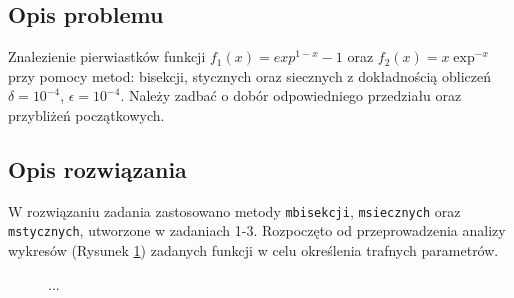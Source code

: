 \documentclass{classrep}
\begin{document}
	\subsection{Opis problemu}
		Znalezienie pierwiastków funkcji $f_1(x)=exp^{1-x}-1$ oraz $f_2(x)=x\exp^{-x}$ przy pomocy metod: bisekcji, stycznych oraz siecznych z dokładnością obliczeń $\delta=10^{-4}$, $\epsilon=10^{-4}$. Należy zadbać o dobór odpowiedniego przedziału oraz przybliżeń początkowych.
		
	\subsection{Opis rozwiązania}
		W rozwiązaniu zadania zastosowano metody \texttt{mbisekcji}, \texttt{msiecznych} oraz \texttt{mstycznych}, utworzone w zadaniach 1-3.
		Rozpoczęto od przeprowadzenia analizy wykresów (Rysunek \ref{fig:2}) zadanych funkcji w celu określenia trafnych parametrów.
		
		\begin{figure}[!htbp]
			\centering
			 \hfill
  			\caption{...}
  			\label{fig:2}
		\end{figure}		
		
\end{document}
